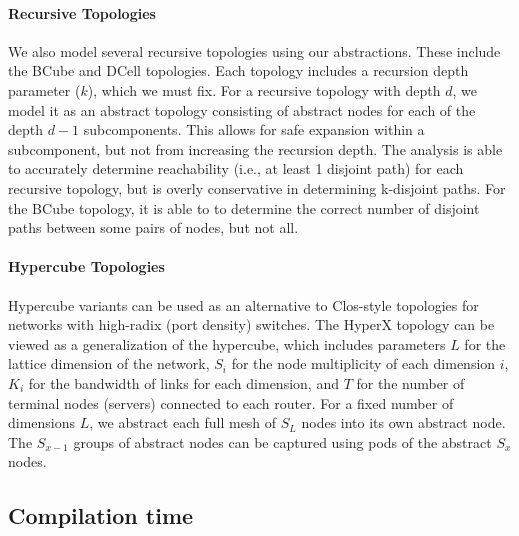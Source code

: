 \documentclass{sig-alternate-10pt}
\newcommand{\para}[1]{\paragraph*{\textbf{#1}}}
\begin{document}
\para{Recursive Topologies}

We also model several recursive topologies using our abstractions. These include the BCube and DCell topologies. Each topology includes a recursion depth parameter ($k$), which we must fix. For a recursive topology with depth $d$, we model it as an abstract topology consisting of abstract nodes for each of the depth $d-1$ subcomponents. This allows for safe expansion within a subcomponent, but not from increasing the recursion depth. The analysis is able to accurately determine reachability (i.e., at least 1 disjoint path) for each recursive topology, but is overly conservative in determining k-disjoint paths. For the BCube topology, it is able to to determine the correct number of disjoint paths between some pairs of nodes, but not all.

\para{Hypercube Topologies}

Hypercube variants can be used as an alternative to Clos-style topologies for networks with high-radix (port density) switches. The HyperX topology can be viewed as a generalization of the hypercube, which includes parameters $L$ for the lattice dimension of the network, $S_i$ for the node multiplicity of each dimension $i$, $K_i$ for the bandwidth of links for each dimension, and $T$ for the number of terminal nodes (servers) connected to each router. For a fixed number of dimensions $L$, we abstract each full mesh of $S_L$ nodes into its own abstract node. The $S_{x-1}$ groups of abstract nodes can be captured using pods of the abstract $S_x$ nodes.

%


\subsection{Compilation time}
\end{document}
